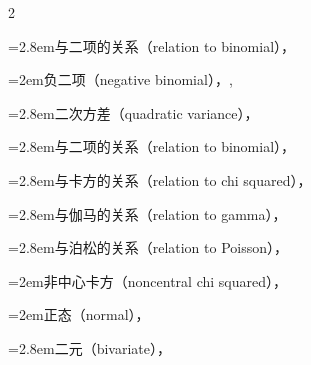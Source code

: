 \begin{multicols}{2}
\par\noindent\hangindent=2.8em\hspace*{1.8em}\label{idx:350}与二项的关系（relation to binomial），\hyperref[idxocc:350:179]{\pageref*{idxocc:350:179}}\par
\par\noindent\hangindent=2em\hspace*{1em}\label{idx:351}负二项（negative binomial），\hyperref[eq:3.2.10]{\pageref*{eq:3.2.10}}, \hyperref[exercise:4.32]{\pageref*{exercise:4.32}}\par
\par\noindent\hangindent=2.8em\hspace*{1.8em}\label{idx:352}二次方差（quadratic variance），\hyperref[idxocc:352:110]{\pageref*{idxocc:352:110}}\par
\par\noindent\hangindent=2.8em\hspace*{1.8em}\label{idx:353}与二项的关系（relation to binomial），\hyperref[exercise:3.12]{\pageref*{exercise:3.12}}\par
\par\noindent\hangindent=2.8em\hspace*{1.8em}\label{idx:354}与卡方的关系（relation to chi squared），\hyperref[exercise:2.38]{\pageref*{exercise:2.38}}\par
\par\noindent\hangindent=2.8em\hspace*{1.8em}\label{idx:355}与伽马的关系（relation to gamma），\hyperref[exercise:3.18]{\pageref*{exercise:3.18}}\par
\par\noindent\hangindent=2.8em\hspace*{1.8em}\label{idx:356}与泊松的关系（relation to Poisson），\hyperref[idxocc:356:110]{\pageref*{idxocc:356:110}}\par
\par\noindent\hangindent=2em\hspace*{1em}\label{idx:357}非中心卡方（noncentral chi squared），\hyperref[eq:4.4.3]{\pageref*{eq:4.4.3}}\par
\par\noindent\hangindent=2em\hspace*{1em}\label{idx:358}正态（normal），\hyperref[idxocc:358:114]{\pageref*{idxocc:358:114}}\par
\par\noindent\hangindent=2.8em\hspace*{1.8em}\label{idx:359}二元（bivariate），\hyperref[exercise:4.47]{\pageref*{exercise:4.47}}\par

\end{multicols}
